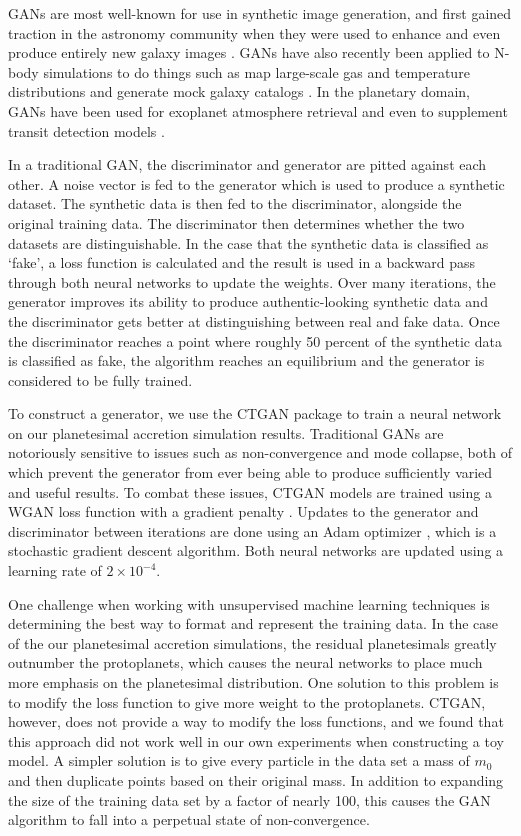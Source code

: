 GANs are most well-known for use in synthetic image generation, and first gained traction in the astronomy community when they were used to enhance \cite{schawinski17} and even produce entirely new galaxy images \cite{dia20}. GANs have also recently been applied to N-body simulations to do things such as map large-scale gas and temperature distributions \cite{troster19} and generate mock galaxy catalogs \cite{jagvaral22}. In the planetary domain, GANs have been used for exoplanet atmosphere retrieval \cite{zingales18} and even to supplement transit detection models \cite{dvash22}.

In a traditional GAN, the discriminator and generator are pitted against each other. A noise vector is fed to the generator which is used to produce a synthetic dataset. The synthetic data is then fed to the discriminator, alongside the original training data. The discriminator then determines whether the two datasets are distinguishable. In the case that the synthetic data is classified as `fake', a loss function is calculated and the result is used in a backward pass through both neural networks to update the weights. Over many iterations, the generator improves its ability to produce authentic-looking synthetic data and the discriminator gets better at distinguishing between real and fake data. Once the discriminator reaches a point where roughly 50 percent of the synthetic data is classified as fake, the algorithm reaches an equilibrium and the generator is considered to be fully trained.

To construct a generator, we use the {\sc CTGAN} \cite{xu19} package to train a neural network on our planetesimal accretion simulation results. Traditional GANs are notoriously sensitive to issues such as non-convergence and mode collapse, both of which prevent the generator from ever being able to produce sufficiently varied and useful results. To combat these issues, {\sc CTGAN} models are trained using a WGAN loss function with a gradient penalty \cite{gulrajani17}. Updates to the generator and discriminator between iterations are done using an Adam optimizer \cite{kingma14}, which is a stochastic gradient descent algorithm. Both neural networks are updated using a learning rate of $2 \times 10^{-4}$.

One challenge when working with unsupervised machine learning techniques is determining the best way to format and represent the training data. In the case of the our planetesimal accretion simulations, the residual planetesimals greatly outnumber the protoplanets, which causes the neural networks to place much more emphasis on the planetesimal distribution. One solution to this problem is to modify the loss function to give more weight to the protoplanets. {\sc CTGAN}, however, does not provide a way to modify the loss functions, and we found that this approach did not work well in our own experiments when constructing a toy model. A simpler solution is to give every particle in the data set a mass of $m_{0}$ and then duplicate points based on their original mass. In addition to expanding the size of the training data set by a factor of nearly 100, this causes the GAN algorithm to fall into a perpetual state of non-convergence.


